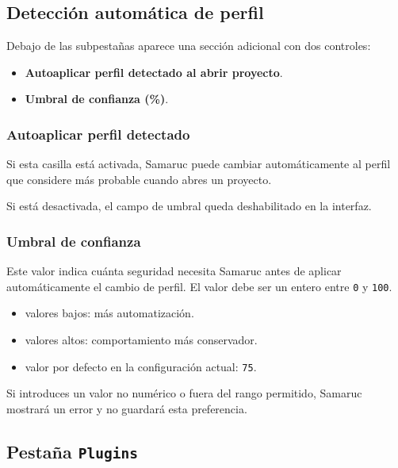 \documentclass[../../main.tex]{subfiles}
\begin{document}
\clearpage

\subsection{Detección automática de perfil}

Debajo de las subpestañas aparece una sección adicional con dos controles:

\begin{itemize}
    \item \textbf{Autoaplicar perfil detectado al abrir proyecto}.
    \item \textbf{Umbral de confianza (\%)}.
\end{itemize}

\subsubsection{Autoaplicar perfil detectado}

Si esta casilla está activada, Samaruc puede cambiar automáticamente al perfil que considere más probable cuando abres un proyecto.

Si está desactivada, el campo de umbral queda deshabilitado en la interfaz.

\subsubsection{Umbral de confianza}

Este valor indica cuánta seguridad necesita Samaruc antes de aplicar automáticamente el cambio de perfil. El valor debe ser un entero entre \texttt{0} y \texttt{100}.

\begin{itemize}
    \item valores bajos: más automatización.
    \item valores altos: comportamiento más conservador.
    \item valor por defecto en la configuración actual: \texttt{75}.
\end{itemize}

Si introduces un valor no numérico o fuera del rango permitido, Samaruc mostrará un error y no guardará esta preferencia.

\clearpage

\subsection{Pestaña \texttt{Plugins}}
\end{document}
